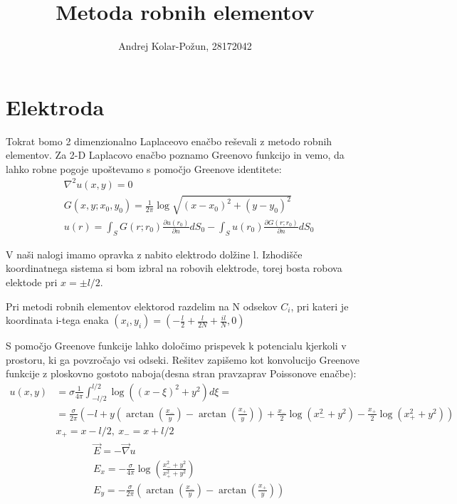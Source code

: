 \documentclass{article}
\title{Metoda robnih elementov}
\author{Andrej Kolar-Požun, 28172042}
\begin{document}
\maketitle
{}
\section{Elektroda}

Tokrat bomo 2 dimenzionalno Laplaceovo enačbo reševali z metodo robnih elementov.
Za 2-D Laplacovo enačbo poznamo Greenovo funkcijo in vemo, da lahko robne pogoje upoštevamo s pomočjo Greenove identitete:
\begin{align*}
&\nabla^2 u(x,y) = 0 \\
&G(x,y;x_0,y_0) = \frac{1}{2\pi} \log \sqrt{(x-x_0)^2 + (y-y_0)^2} \\
&u(r) = \int_S G(r;r_0) \frac{\partial u(r_0)}{\partial n} dS_0 - \int_S u(r_0) \frac{\partial G(r;r_0)}{\partial n} dS_0
\end{align*}

V naši nalogi imamo opravka z nabito elektrodo dolžine l. Izhodišče koordinatnega sistema si bom izbral na robovih elektrode, torej bosta robova elektode pri $x = \pm l/2$.

Pri metodi robnih elementov elektorod razdelim na N odsekov $C_i$, pri kateri je koordinata i-tega enaka $(x_i,y_i) = \left(-\frac{l}{2}+\frac{l}{2N} + \frac{il}{N},0 \right)$

S pomočjo Greenove funkcije lahko določimo prispevek k potencialu kjerkoli v prostoru, ki ga povzročajo vsi  odseki. Rešitev zapišemo kot konvolucijo Greenove funkcije z ploskovno gostoto naboja(desna stran pravzaprav Poissonove enačbe):
\begin{align*}
u(x,y) &= \sigma \frac{1}{4\pi} \int_{-l/2}^{l/2} \log ((x - \xi)^2 + y^2) d\xi = \\ 
&= \frac{\sigma}{2\pi} \left( -l + y\left( \arctan(\frac{x_{-}}{y}) - \arctan(\frac{x_{+}}{y})\right) 
+ \frac{x_{-}}{2} \log(x_{-}^2+y^2)- \frac{x_{+}}{2} \log(x_{+}^2+y^2) \right) \\
&x_{+} = x-l/2, \ x_{-} = x+l/2
\end{align*}
\begin{align*}
&\vec{E} = - \vec{\nabla} u \\
&E_x = -\frac{\sigma}{4\pi} \log( \frac{x_-^2 + y^2}{x_+^2 + y^2})\\
&E_y = -\frac{\sigma}{2\pi} \left( \arctan(\frac{x_-}{y}) - \arctan(\frac{x_+}{y}) \right)\\
\end{align*}
\end{document}
